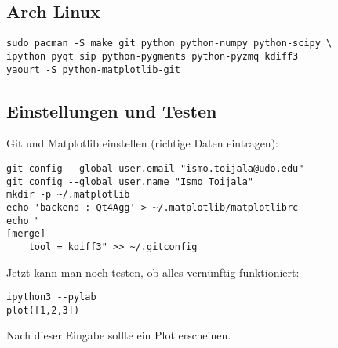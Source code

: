 \subsection{Arch Linux}
\begin{verbatim}
sudo pacman -S make git python python-numpy python-scipy \
ipython pyqt sip python-pygments python-pyzmq kdiff3
yaourt -S python-matplotlib-git
\end{verbatim}

\subsection{Einstellungen und Testen}
\label{install-test}
Git und Matplotlib einstellen (richtige Daten eintragen):
\begin{verbatim}
git config --global user.email "ismo.toijala@udo.edu"
git config --global user.name "Ismo Toijala"
mkdir -p ~/.matplotlib
echo 'backend : Qt4Agg' > ~/.matplotlib/matplotlibrc
echo "
[merge]
    tool = kdiff3" >> ~/.gitconfig
\end{verbatim}
Jetzt kann man noch testen, ob alles vernünftig funktioniert:
\begin{verbatim}
ipython3 --pylab
plot([1,2,3])
\end{verbatim}
Nach dieser Eingabe sollte ein Plot erscheinen.
